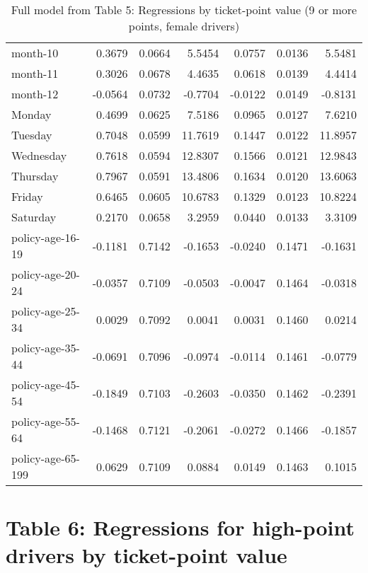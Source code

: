 \documentclass[10pt]{article}
\begin{document}
\begin{table}[ht]
\begin{tabular}{lrrrrrr}
  month-10 & 0.3679 & 0.0664 & 5.5454 & 0.0757 & 0.0136 & 5.5481 \\ 
  month-11 & 0.3026 & 0.0678 & 4.4635 & 0.0618 & 0.0139 & 4.4414 \\ 
  month-12 & -0.0564 & 0.0732 & -0.7704 & -0.0122 & 0.0149 & -0.8131 \\ 
  Monday & 0.4699 & 0.0625 & 7.5186 & 0.0965 & 0.0127 & 7.6210 \\ 
  Tuesday & 0.7048 & 0.0599 & 11.7619 & 0.1447 & 0.0122 & 11.8957 \\ 
  Wednesday & 0.7618 & 0.0594 & 12.8307 & 0.1566 & 0.0121 & 12.9843 \\ 
  Thursday & 0.7967 & 0.0591 & 13.4806 & 0.1634 & 0.0120 & 13.6063 \\ 
  Friday & 0.6465 & 0.0605 & 10.6783 & 0.1329 & 0.0123 & 10.8224 \\ 
  Saturday & 0.2170 & 0.0658 & 3.2959 & 0.0440 & 0.0133 & 3.3109 \\ 
  policy-age-16-19 & -0.1181 & 0.7142 & -0.1653 & -0.0240 & 0.1471 & -0.1631 \\ 
  policy-age-20-24 & -0.0357 & 0.7109 & -0.0503 & -0.0047 & 0.1464 & -0.0318 \\ 
  policy-age-25-34 & 0.0029 & 0.7092 & 0.0041 & 0.0031 & 0.1460 & 0.0214 \\ 
  policy-age-35-44 & -0.0691 & 0.7096 & -0.0974 & -0.0114 & 0.1461 & -0.0779 \\ 
  policy-age-45-54 & -0.1849 & 0.7103 & -0.2603 & -0.0350 & 0.1462 & -0.2391 \\ 
  policy-age-55-64 & -0.1468 & 0.7121 & -0.2061 & -0.0272 & 0.1466 & -0.1857 \\ 
  policy-age-65-199 & 0.0629 & 0.7109 & 0.0884 & 0.0149 & 0.1463 & 0.1015 \\ 
   \hline
\end{tabular}
\caption{Full model from Table 5: Regressions by ticket-point value (9 or more points, female drivers)} 
\label{tab_5_9plus_pts_F}
\end{table}


\clearpage
\pagebreak




\section{Table 6: Regressions for high-point drivers by ticket-point value}
\end{document}
